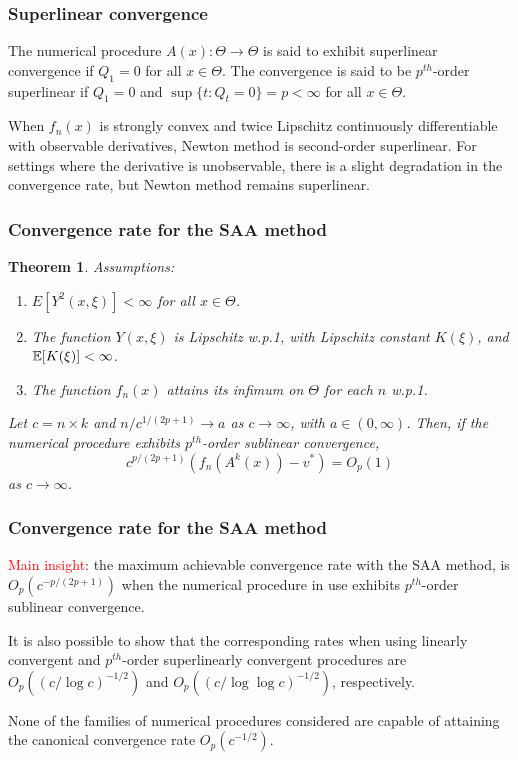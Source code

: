 \documentclass[usepdftitle=false, aspectratio=169]{beamer}
\newtheorem{theo}{Theorem}
\begin{document}
\begin{frame}
\frametitle{Superlinear convergence}

\begin{definition}
The numerical procedure $A(x) : \Theta \rightarrow \Theta$ is said to exhibit superlinear convergence if $Q_1 = 0$ for all $x \in \Theta$.
The convergence is said to be $p^{th}$-order superlinear if $Q_1 = 0$ and $\sup \{ t : Q_t = 0 \} = p < \infty$ for all $x \in \Theta$.
\end{definition}

\mbox{}

When $f_n(x)$ is strongly convex and twice Lipschitz continuously differentiable with observable derivatives, Newton method is second-order superlinear.
For settings where the derivative is unobservable, there is a slight degradation in the convergence rate, but Newton method remains superlinear.

\end{frame}

\begin{frame}
\frametitle{Convergence rate for the SAA method}

\begin{theo}
Assumptions:
\begin{enumerate}
\item
$E[ Y^2 ( x , \xi)] < \infty$ for all $x \in \Theta$.
\item
The function $Y(x, \xi)$ is Lipschitz w.p.1, with Lipschitz constant $K(\xi)$, and ${\mathbb{E}}[K(\xi)] < \infty$.
\item
The function $f_n(x)$ attains its infimum on $\Theta$ for each $n$ w.p.1.
\end{enumerate}
Let $c = n \times k$ and $n/c^{1 /( 2p + 1 )} \rightarrow a$ as $c \rightarrow \infty$, with $a \in (0, \infty)$.
Then, if the numerical procedure exhibits $p^{th}$-order sublinear convergence,
$$
c^{p /( 2p + 1 )} \left( f_n ( A^k ( x )) - v^* \right) = O_p(1)
$$
as $c \rightarrow \infty$.
\end{theo}

\end{frame}

\begin{frame}
\frametitle{Convergence rate for the SAA method}

\textcolor{red}{Main insight}: the maximum achievable convergence rate with the SAA method, is $O_p ( c^{- p /( 2p + 1 )})$ when the numerical
procedure in use exhibits $p^{th}$-order sublinear convergence.

\mbox{}

It is also possible to show that the corresponding rates when using linearly convergent and $p^{th}$-order superlinearly convergent procedures are $O_p (( c / \log c )^{-1/2} )$ and $O_p (( c / \log\log c )^{-1/2} )$, respectively.

\mbox{}

None of the families of numerical procedures considered are capable
of attaining the canonical convergence rate $O_p ( c^{-1/2} )$.

\end{frame}
\end{document}
